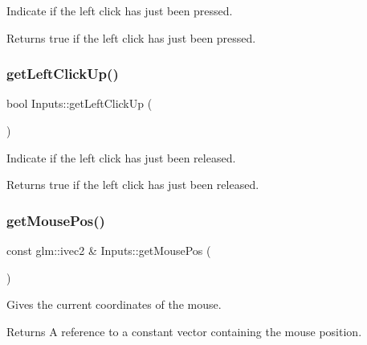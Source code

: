 Indicate if the left click has just been pressed.

\begin{DoxyReturn}{Returns}
true if the left click has just been pressed. 
\end{DoxyReturn}
\mbox{\label{class_inputs_a458bdc3d408476dfe439dc94047f292e}} 
\subsubsection{\texorpdfstring{get\+Left\+Click\+Up()}{getLeftClickUp()}}
{\footnotesize\ttfamily bool Inputs\+::get\+Left\+Click\+Up (\begin{DoxyParamCaption}{ }\end{DoxyParamCaption})\hspace{0.3cm}{\ttfamily [static]}}

Indicate if the left click has just been released.

\begin{DoxyReturn}{Returns}
true if the left click has just been released. 
\end{DoxyReturn}
\mbox{\label{class_inputs_afc7227e1c5cd934309955f8db3c36097}} 
\subsubsection{\texorpdfstring{get\+Mouse\+Pos()}{getMousePos()}}
{\footnotesize\ttfamily const glm\+::ivec2 \& Inputs\+::get\+Mouse\+Pos (\begin{DoxyParamCaption}{ }\end{DoxyParamCaption})\hspace{0.3cm}{\ttfamily [static]}}

Gives the current coordinates of the mouse.

\begin{DoxyReturn}{Returns}
A reference to a constant vector containing the mouse position. 
\end{DoxyReturn}
\mbox{\label{class_inputs_abf9d434be64729115891ba206add1c68}} 
